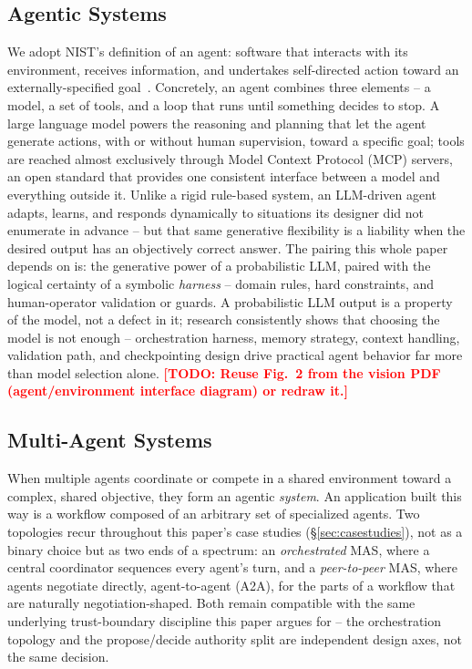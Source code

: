 \documentclass[10pt,conference]{IEEEtran}
\newcommand{\todo}[1]{\textcolor{red}{\textbf{[TODO: #1]}}}
\begin{document}
\subsection{Agentic Systems}
We adopt NIST's definition of an agent: software that interacts with its
environment, receives information, and undertakes self-directed action
toward an externally-specified goal~\cite{nist_glossary_agent}. Concretely,
an agent combines three elements -- a model, a set of tools, and a loop that
runs until something decides to stop. A large language model powers the
reasoning and planning that let the agent generate actions, with or without
human supervision, toward a specific goal; tools are reached almost
exclusively through Model Context Protocol (MCP) servers, an open standard
that provides one consistent interface between a model and everything
outside it. Unlike a rigid rule-based system, an LLM-driven agent adapts,
learns, and responds dynamically to situations its designer did not
enumerate in advance -- but that same generative flexibility is a liability
when the desired output has an objectively correct answer. The pairing this
whole paper depends on is: the generative power of a probabilistic LLM,
paired with the logical certainty of a symbolic \emph{harness} -- domain
rules, hard constraints, and human-operator validation or guards. A
probabilistic LLM output is a property of the model, not a defect in it;
research consistently shows that choosing the model is not enough --
orchestration harness, memory strategy, context handling, validation path,
and checkpointing design drive practical agent behavior far more than model
selection alone. \todo{Reuse Fig.~2 from the vision PDF (agent/environment
interface diagram) or redraw it.}

\subsection{Multi-Agent Systems}
When multiple agents coordinate or compete in a shared environment toward a
complex, shared objective, they form an agentic \emph{system}. An
application built this way is a workflow composed of an arbitrary set of
specialized agents. Two topologies recur throughout this paper's case
studies (\S\ref{sec:casestudies}), not as a binary choice but as two ends of
a spectrum: an \emph{orchestrated} MAS, where a central coordinator sequences
every agent's turn, and a \emph{peer-to-peer} MAS, where agents negotiate
directly, agent-to-agent (A2A), for the parts of a workflow that are
naturally negotiation-shaped. Both remain compatible with the same
underlying trust-boundary discipline this paper argues for -- the
orchestration topology and the propose/decide authority split are
independent design axes, not the same decision.
\end{document}
